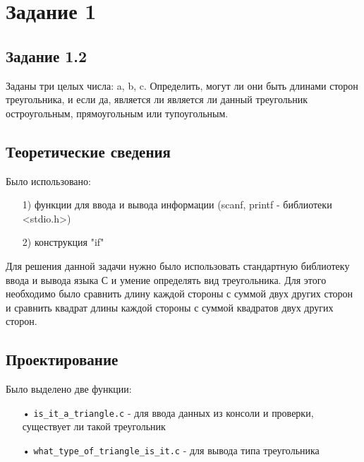\documentclass[12pt,a4paper]{report}
\begin{document}
\section{Задание 1}
\subsection{Задание 1.2}
Заданы три целых числа: a, b, c. Определить, могут ли они быть длинами сторон треугольника, и если да, является ли является ли данный треугольник остроугольным, прямоугольным или тупоугольным.
\subsection{Теоретические сведения}

Было использовано:
\begin{enumerate}
\item[1)] функции для ввода и вывода информации (scanf, printf - библиотеки <stdio.h>)

\item[2)] конструкция "if"

\end{enumerate}

Для решения данной задачи нужно было использовать стандартную библиотеку ввода и вывода языка С и умение определять вид треугольника.
Для этого необходимо было сравнить длину каждой стороны с суммой двух других сторон и сравнить квадрат длины каждой стороны с суммой квадратов двух других сторон.

\subsection{Проектирование}

Было выделено две функции:
\begin{enumerate}
\item[•]   \verb-is_it_a_triangle.c- - для ввода данных из консоли и проверки, существует ли такой треугольник
\item[•]   \verb-what_type_of_triangle_is_it.c- - для вывода типа треугольника
\end{enumerate}
\end{document}
